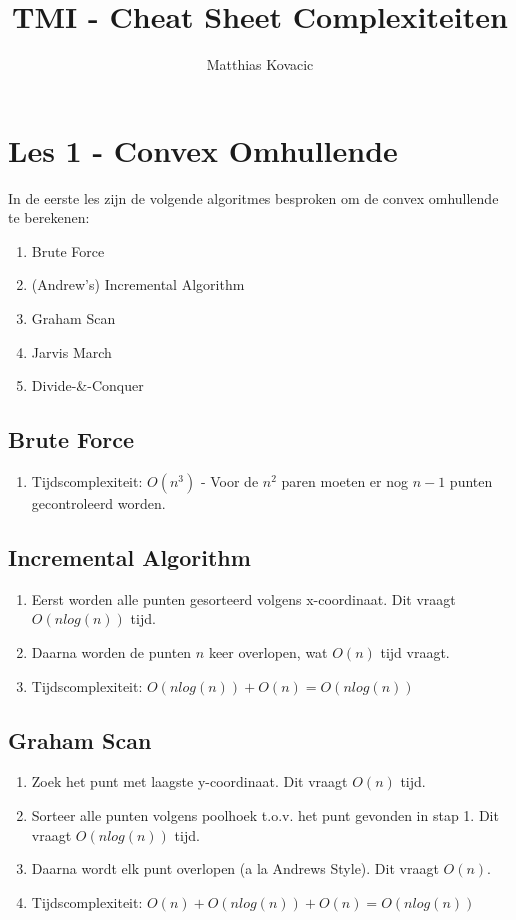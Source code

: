 \documentclass[12pt,a4paper]{article}
\author{Matthias Kovacic}
\title{TMI - Cheat Sheet Complexiteiten}
\begin{document}
	\maketitle
	\section{Les 1 - Convex Omhullende}
		In de eerste les zijn de volgende algoritmes besproken om de convex omhullende te berekenen:
		\begin{enumerate}
			\item Brute Force
			\item (Andrew's) Incremental Algorithm
			\item Graham Scan
			\item Jarvis March
			\item Divide-\&-Conquer
		\end{enumerate}
	
		\subsection{Brute Force}
			\begin{enumerate}
				\item Tijdscomplexiteit: $O(n^3)$ - Voor de $n^2$ paren moeten er nog $n - 1$ punten gecontroleerd worden.
			\end{enumerate}
		
		\subsection{Incremental Algorithm}
			\begin{enumerate}
				\item Eerst worden alle punten gesorteerd volgens x-coordinaat. Dit vraagt $O(n log (n))$ tijd.
				\item Daarna worden de punten $n$ keer overlopen, wat $O(n)$ tijd vraagt.
				\item Tijdscomplexiteit: $O(n log(n)) + O(n) = O(n log (n))$
			\end{enumerate}
		
		\subsection{Graham Scan}
			\begin{enumerate}
				\item Zoek het punt met laagste y-coordinaat. Dit vraagt $O(n)$ tijd.
				\item Sorteer alle punten volgens poolhoek t.o.v. het punt gevonden in stap 1. Dit vraagt $O(n log (n))$ tijd.
				\item Daarna wordt elk punt overlopen (a la Andrews Style). Dit vraagt $O(n)$.
				\item Tijdscomplexiteit: $O(n) + O(n log(n)) + O(n) = O(n log (n))$
			\end{enumerate}
		
\end{document}
